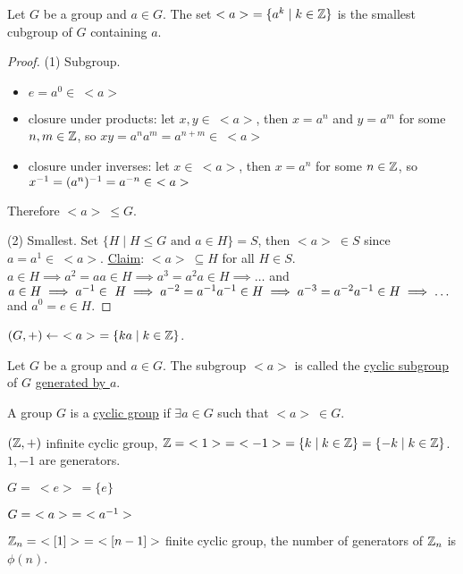 \documentclass[]{article}
\begin{document}
\begin{theorem}
	Let $G$ be a group and $a\in G$. The set $<a>\ = \{a^k \mid k\in \mathbb{Z}\}$ is the smallest cubgroup of $G$ containing $a$.
\end{theorem}
\begin{proof}
	(1) Subgroup.
	\begin{itemize}
		\item $e = a^0 \in\ <a>$
		\item closure under products: let $x,y\in\ <a>$, then $x = a^n$ and $y=a^m$ for some $n,m\in\mathbb{Z}$, so $xy = a^na^m = a^{n+m}\in\ <a>$
		\item closure under inverses: let $x\in\ <a>$, then $x=a^n$ for some $n\in\mathbb{Z}$, so $x\inv = (a^n)\inv = a^{-n}\in\ <a>$
	\end{itemize}
	Therefore $<a>\ \leq G$.

	(2) Smallest.
	Set $\{H\mid H\leq G \text{ and } a\in H\} = S$, then $<a>\ \in S$ since $a = a^1 \in\ <a>$. \ul{Claim}: $<a>\ \subseteq H$ for all $H\in S$.
	$a\in H \implies a^2 = aa\in H \implies a^3 = a^2a\in H \implies \dots$ and $a\in H\implies a^{-1}\in~H \implies a^{-2} = a^{-1} a^{-1} \in H \implies a^{-3} = a^{-2}a^{-1} \in H \implies \dots$ and $a^0 = e\in H$.
\end{proof}
\begin{note}
	$(G,+) \leftarrow\ <a>\ = \{ka \mid k\in\mathbb{Z}\}$.
\end{note}
\begin{definition}
	Let $G$ be a group and $a\in G$. The subgroup $<a>$ is called the \ul{cyclic subgroup} of $G$ \ul{generated by $a$}.
\end{definition}
\begin{definition}
	A group $G$ is a \ul{cyclic group} if $\exists a\in G$ such that $<a>\ \in G$.
\end{definition}
\begin{example}
	$(\mathbb{Z},+)$ infinite cyclic group, $\mathbb{Z} =\ <1>\ =\ <-1>\ = \{k\mid k\in\mathbb{Z}\} = \{-k\mid k\in\mathbb{Z}\}$. $1,-1$ are generators.
\end{example}
\begin{example}
	$G =\ <e>\ = \{e\}$
\end{example}
\begin{remark}
	$G =\ <a>\ =\ <a^{-1} >$
\end{remark}
\begin{example}
	$\mb Z_n =\ <[1]>\ =\ <[n-1]>$ finite cyclic group, the number of generators of $\mathbb{Z}_n$ is $\phi(n)$.
\end{example}
\end{document}
